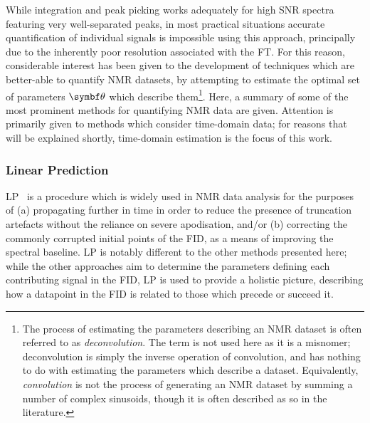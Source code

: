 While integration and peak picking works adequately for high \ac{SNR} spectra
featuring very well-separated peaks, in most practical situations accurate
quantification of individual signals is impossible using this approach,
principally due to the inherently poor resolution associated with the
\ac{FT}.
For this reason, considerable interest has been given to the development of
techniques which are better-able to quantify \ac{NMR} datasets, by attempting
to estimate the optimal set of parameters $\bth$ which describe them\footnote{
    The process of estimating the parameters describing an \ac{NMR}
    dataset is often referred to as \emph{deconvolution}. The term is not used
    here as it is a misnomer; deconvolution is simply the inverse operation of
    convolution, and has nothing to do with estimating the parameters which
    describe a dataset. Equivalently, \emph{convolution} is not the process of
    generating an \ac{NMR} dataset by summing a number of complex
    sinusoids, though it is often described as so in the literature.
}.
Here, a summary of some of the most prominent methods for quantifying \ac{NMR}
data are given. Attention is primarily given to methods which consider
time-domain data; for reasons that will be explained shortly, time-domain
estimation is the focus of this work.

\subsubsection{Linear Prediction}
\Ac{LP}~\cite{Stephenson1988,Koehl1999,Marion1989b,Zhu1992} is a procedure which
is widely used in \ac{NMR} data analysis for the purposes of (a) propagating
 further in time in order to reduce the presence of truncation
artefacts without the reliance on severe apodisation, and/or (b) correcting the
commonly corrupted initial points of the \ac{FID}, as a means of improving the
spectral baseline. \ac{LP} is notably different to the other methods presented
here; while the other approaches aim to determine the parameters defining each
contributing signal in the \ac{FID}, \ac{LP} is used to provide a holistic
picture, describing how a datapoint in the \ac{FID} is related to those
which precede or succeed it.

